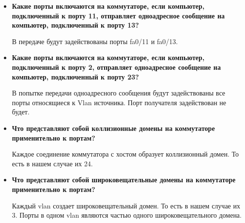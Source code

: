 \documentclass[a4paper,14pt]{extarticle}
\begin{document}
\begin{enumerate}
\begin{itemize}
            \item \textbf{Какие порты включаются на коммутаторе, если компьютер, \linebreak подключенный к порту 11, отправляет одноадресное сообщение на компьютер, подключенный к порту 13?}\par
            В передаче будут задействованы порты fa0/11 и fa0/13.

            \item \textbf{Какие порты включаются на коммутаторе, если компьютер, \linebreak подключенный к порту 2, отправляет одноадресное сообщение на \linebreak компьютер, подключенный к порту 23?}\par
            В попытке передачи одноадресного сообщения будут задействованы все порты относящиеся к Vlan источника. Порт получателя задействован не будет.

            \item \textbf{Что представляют собой коллизионные домены на коммутаторе применительно к портам?}\par
            Каждое соединение коммутатора с хостом образует коллизионный домен. То есть в нашем случае их 24.

            \item \textbf{Что представляют собой широковещательные домены на коммутаторе применительно к портам?}\par
            Каждый vlan создает широковещательный домен. То есть в нашем случае их 3. Порты в одном vlan являются частью одного широковещательного домена.


\end{itemize}
\end{enumerate}
\end{document}
